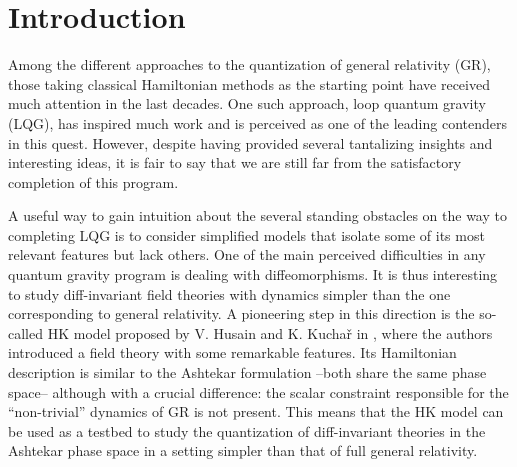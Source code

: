 \documentclass[12pt]{amsart}
\theoremstyle{plain}
\theoremstyle{definition}
\theoremstyle{remark}
\numberwithin{equation}{section}  %
\begin{document}
	
\maketitle













	

%
%
\section{Introduction}{\label{sec_intro}}

Among the different approaches to the quantization of general relativity (GR), those taking classical Hamiltonian methods as the starting point have received much attention in the last decades. One such approach, loop quantum gravity (LQG), has inspired much work and is perceived as one of the leading contenders in this quest. However, despite having provided several tantalizing insights and interesting ideas, it is fair to say that we are still far from the satisfactory completion of this program.

A useful way to gain intuition about the several standing obstacles on the way to completing LQG is to consider simplified models that isolate some of its most relevant features but lack others. One of the main perceived difficulties in any quantum gravity program is dealing with diffeomorphisms. It is thus interesting to study diff-invariant field theories with dynamics simpler than the one corresponding to general relativity. A pioneering step in this direction is the so-called HK model proposed by V. Husain and K. Kuchař in \cite{HK}, where the authors introduced a field theory with some remarkable features. Its Hamiltonian description is similar to the Ashtekar formulation \cite{Ashtekar1, Ashtekar2} --both share the same phase space-- although with a crucial difference: the scalar constraint responsible for the ``non-trivial'' dynamics of GR is not present. This means that the HK model can be used as a testbed to study the quantization of diff-invariant theories in the Ashtekar phase space in a setting simpler than that of full general relativity.
\end{document}
